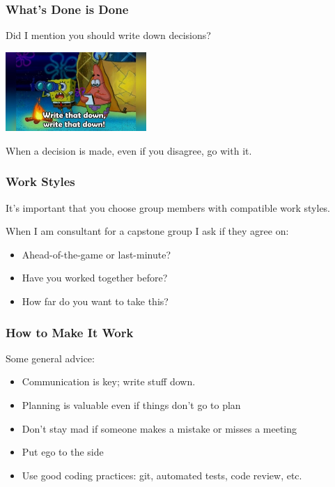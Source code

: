 \begin{frame}
\frametitle{What's Done is Done}

Did I mention you should write down decisions? 
\begin{center}
	\includegraphics[width=0.4\textwidth]{images/writedown.jpg}
\end{center}

When a decision is made, even if you disagree, go with it.

\end{frame}

\begin{frame}
\frametitle{Work Styles}

It's important that you choose group members with compatible work styles.

When I am consultant for a capstone group I ask if they agree on:

\begin{itemize}
	\item Ahead-of-the-game or last-minute?
	\item Have you worked together before?
	\item How far do you want to take this?
\end{itemize}

\end{frame}

\begin{frame}
\frametitle{How to Make It Work}
Some general advice:

\begin{itemize}
	\item Communication is key; write stuff down.
	\item Planning is valuable even if things don't go to plan
	\item Don't stay mad if someone makes a mistake or misses a meeting
	\item Put ego to the side
	\item Use good coding practices: git, automated tests, code review, etc.
\end{itemize}

\end{frame}

